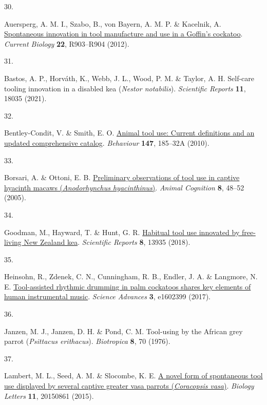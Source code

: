 \documentclass[
  man,floatsintext]{apa6}
\newlength{\cslhangindent}
\newlength{\csllabelwidth}
\newlength{\cslentryspacingunit} %
\newenvironment{CSLReferences}[2] %
 {%
  \setlength{\parindent}{0pt}
  \ifodd #1
  \let\oldpar\par
  \def\par{\hangindent=\cslhangindent\oldpar}
  \fi
  \setlength{\parskip}{#2\cslentryspacingunit}
 }%
 {}
\newcommand{\CSLLeftMargin}[1]{\parbox[t]{\csllabelwidth}{#1}}
\newcommand{\CSLRightInline}[1]{\parbox[t]{\linewidth - \csllabelwidth}{#1}\break}
\begin{document}
\begin{CSLReferences}{0}{0}
\leavevmode{}%
\CSLLeftMargin{30. }%
\CSLRightInline{Auersperg, A. M. I., Szabo, B., von Bayern, A. M. P. \& Kacelnik, A. \href{https://doi.org/10.1016/j.cub.2012.09.002}{Spontaneous innovation in tool manufacture and use in a {G}offin's cockatoo}. \emph{Current Biology} \textbf{22}, R903--R904 (2012).}

\leavevmode{}%
\CSLLeftMargin{31. }%
\CSLRightInline{Bastos, A. P., Horváth, K., Webb, J. L., Wood, P. M. \& Taylor, A. H. Self-care tooling innovation in a disabled kea (\emph{{N}estor notabilis}). \emph{Scientific Reports} \textbf{11}, 18035 (2021).}

\leavevmode{}%
\CSLLeftMargin{32. }%
\CSLRightInline{Bentley-Condit, V. \& Smith, E. O. \href{https://doi.org/10.1163/000579509X12512865686555}{Animal tool use: Current definitions and an updated comprehensive catalog}. \emph{Behaviour} \textbf{147}, 185--32A (2010).}

\leavevmode{}%
\CSLLeftMargin{33. }%
\CSLRightInline{Borsari, A. \& Ottoni, E. B. \href{https://doi.org/10.1007/s10071-004-0221-3}{Preliminary observations of tool use in captive hyacinth macaws (\emph{{A}nodorhynchus hyacinthinus})}. \emph{Animal Cognition} \textbf{8}, 48--52 (2005).}

\leavevmode{}%
\CSLLeftMargin{34. }%
\CSLRightInline{Goodman, M., Hayward, T. \& Hunt, G. R. \href{https://doi.org/10.1038/s41598-018-32363-9}{Habitual tool use innovated by free-living {N}ew {Z}ealand kea}. \emph{Scientific Reports} \textbf{8}, 13935 (2018).}

\leavevmode{}%
\CSLLeftMargin{35. }%
\CSLRightInline{Heinsohn, R., Zdenek, C. N., Cunningham, R. B., Endler, J. A. \& Langmore, N. E. \href{https://doi.org/10.1126/sciadv.1602399}{Tool-assisted rhythmic drumming in palm cockatoos shares key elements of human instrumental music}. \emph{Science Advances} \textbf{3}, e1602399 (2017).}

\leavevmode{}%
\CSLLeftMargin{36. }%
\CSLRightInline{Janzen, M. J., Janzen, D. H. \& Pond, C. M. Tool-using by the {A}frican grey parrot (\emph{{P}sittacus erithacus}). \emph{Biotropica} \textbf{8}, 70 (1976).}

\leavevmode{}%
\CSLLeftMargin{37. }%
\CSLRightInline{Lambert, M. L., Seed, A. M. \& Slocombe, K. E. \href{https://doi.org/10.1098/rsbl.2015.0861}{A novel form of spontaneous tool use displayed by several captive greater vasa parrots (\emph{{C}oracopsis vasa})}. \emph{Biology Letters} \textbf{11}, 20150861 (2015).}


\end{CSLReferences}
\end{document}

